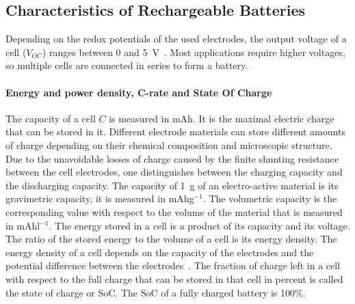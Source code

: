 \subsection{Characteristics of Rechargeable Batteries}
Depending on the redox potentials of the used electrodes, the output voltage of a cell ($V_{OC}$) ranges between 0 and 5~V~\cite{janoschka2012_advmater}. Most applications require higher voltages, so multiple cells are connected in series to form a battery.%

\paragraph{Energy and power density, C-rate and State Of Charge}
The capacity of a cell $C$ is measured in mAh. It is the maximal electric charge that can be stored in it. Different electrode materials can store different amounts of charge depending on their chemical composition and microscopic structure. Due to the unavoidable losses of charge caused by the finite shunting resistance between the cell electrodes, one distinguishes between the charging capacity and the discharging capacity. The capacity of 1~g of an electro-active material is its gravimetric capacity, it is measured in mAhg$^{-1}$. The volumetric capacity is the corresponding value with respect to the volume of the material that is measured in mAhl$^{-1}$. The energy stored in a cell is a product of its capacity and its voltage. The ratio of the stored energy to the volume of a cell is its energy density. The energy density of a cell depends on the capacity of the electrodes and the potential difference between the electrodes~\cite{Liu2016}. The fraction of charge left in a cell with respect to the full charge that can be stored in that cell in percent is called the state of charge or SoC. The SoC of a fully charged battery is 100\%.\\
\par
